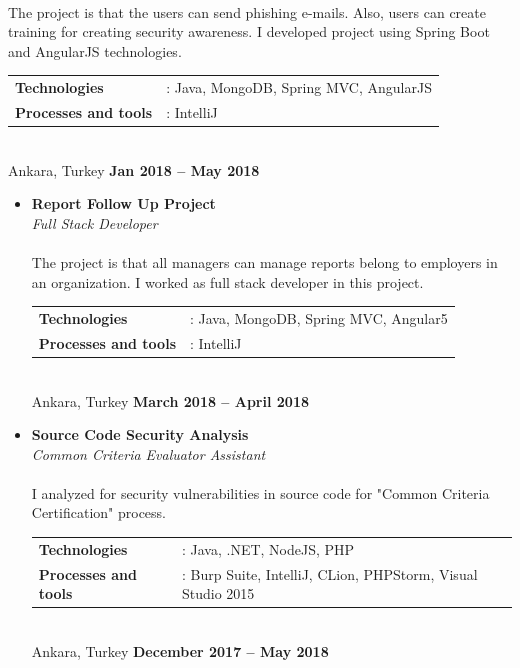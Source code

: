 \documentclass[margin]{res}
\begin{document}
\begin{resume}
\begin{itemize}
    \\
    The project is that the users can send phishing e-mails. Also, users can create training for creating security awareness. I developed project using Spring Boot and AngularJS technologies.   \\
    \begin{tabular}{@{} l l}
        \textbf{Technologies} & :  Java, MongoDB, Spring MVC, AngularJS \\ 
        \textbf{Processes and tools} & :  IntelliJ \\
    \end{tabular}
    \\
    Ankara, Turkey
    \hfill {\bf Jan 2018 – May 2018 }\\[0.08in] \newline
\end{itemize}
\begin{itemize}
    \item 
    \textbf {Report Follow Up Project} \\
    \textit{Full Stack Developer} \\
    \\
    The project is that all managers can manage reports belong to employers in an organization. I worked as full stack developer in this project.    \\
    \begin{tabular}{@{} l l}
        \textbf{Technologies} & :  Java, MongoDB, Spring MVC, Angular5 \\ 
        \textbf{Processes and tools} & :  IntelliJ \\
    \end{tabular}
    \\
    Ankara, Turkey
    \hfill {\bf March 2018 – April 2018 }\\[0.08in] \newline
\end{itemize}
\begin{itemize}
    \item 
    \textbf {Source Code Security Analysis} \\
    \textit{Common Criteria Evaluator Assistant} \\
    \\
    I analyzed for security vulnerabilities in source code for "Common Criteria Certification" process.   \\
    \begin{tabular}{@{} l l}
        \textbf{Technologies} & :  Java, .NET, NodeJS, PHP \\ 
        \textbf{Processes and tools} & :  Burp Suite, IntelliJ, CLion, PHPStorm, Visual Studio 2015 \\
    \end{tabular}
    \\
    Ankara, Turkey
    \hfill {\bf December 2017 – May 2018 }\\[0.08in] \newline
\end{itemize}

\end{resume}
\end{document}
